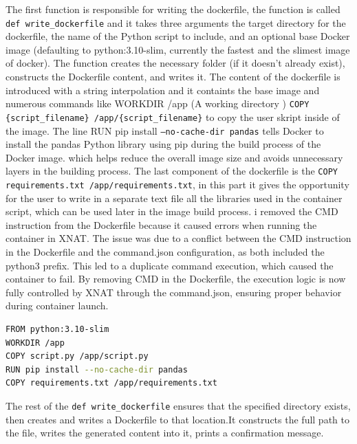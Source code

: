 The first function is responsible for writing the dockerfile, the function is called \texttt{def write\_dockerfile} and it takes three arguments the target directory for the dockerfile, the name of the Python script to include, and an optional base Docker image (defaulting to python:3.10-slim, currently the fastest and the slimest image of docker). The function creates the necessary folder (if it doesn't already exist), constructs the Dockerfile content, and writes it. The content of the dockerfile is introduced with a string interpolation and it containts the base image and numerous commands like WORKDIR /app (A working directory ) \texttt{COPY \{script\_filename\} /app/\{script\_filename\}} to copy the user skript inside of the image. The line  RUN pip install \texttt{--no-cache-dir pandas} tells Docker to install the pandas Python library using pip during the build process of the Docker image.  which helps reduce the overall image size and avoids unnecessary layers in the building process. The last component of the dockerfile is the \texttt{COPY requirements.txt /app/requirements.txt}, in this part it gives the opportunity for the user to write in a separate text file all the libraries used in the container script, which can be used later in the image build process.
i removed the CMD instruction from the Dockerfile because it caused errors when running the container in XNAT. The issue was due to a conflict between the CMD instruction in the Dockerfile and the command.json configuration, as both included the python3 prefix. This led to a duplicate command execution, which caused the container to fail. By removing CMD in the Dockerfile, the execution logic is now fully controlled by XNAT through the command.json, ensuring proper behavior during container launch.

\begin{lstlisting}[language=bash]
FROM python:3.10-slim
WORKDIR /app
COPY script.py /app/script.py
RUN pip install --no-cache-dir pandas
COPY requirements.txt /app/requirements.txt
\end{lstlisting}
The rest of the \texttt{def write\_dockerfile} ensures that the specified directory exists, then creates and writes a Dockerfile to that location.It constructs the full path to the file, writes the generated content into it, prints a confirmation message.




